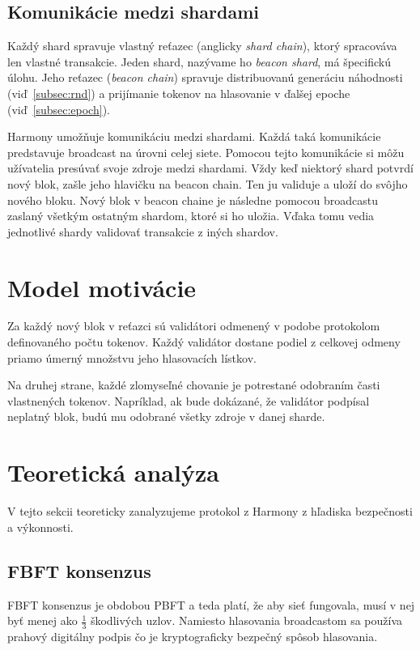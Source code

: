 \subsection{Komunikácie medzi shardami}\label{subsec:cross-com}
Každý shard spravuje vlastný reťazec (anglicky \textit{shard chain}), ktorý spracováva len vlastné transakcie. Jeden shard, nazývame ho \textit{beacon shard}, má špecifickú úlohu. Jeho reťazec (\textit{beacon chain}) spravuje distribuovanú generáciu náhodnosti (viď~\ref{subsec:rnd}) a prijímanie tokenov na hlasovanie v ďalšej epoche (viď~\ref{subsec:epoch}).

Harmony umožňuje komunikáciu medzi shardami. Každá taká komunikácie predstavuje broadcast na úrovni celej siete. Pomocou tejto komunikácie si môžu užívatelia presúvať svoje zdroje medzi shardami. Vždy keď niektorý shard potvrdí nový blok, zašle jeho hlavičku na beacon chain. Ten ju validuje a uloží do svôjho nového bloku. Nový blok v beacon chaine je následne pomocou broadcastu zaslaný všetkým ostatným shardom, ktoré si ho uložia. Vďaka tomu vedia jednotlivé shardy validovať transakcie z iných shardov.

\section{Model motivácie}

Za každý nový blok v reťazci sú validátori odmenený v podobe protokolom definovaného počtu tokenov. Každý validátor dostane podiel z celkovej odmeny priamo úmerný množstvu jeho hlasovacích lístkov.

Na druhej strane, každé zlomyseľné chovanie je potrestané odobraním časti vlastnených tokenov. Napríklad, ak bude dokázané, že validátor podpísal neplatný blok, budú mu odobrané všetky zdroje v danej sharde.

\section{Teoretická analýza}
V tejto sekcii teoreticky zanalyzujeme protokol z Harmony z hľadiska bezpečnosti a výkonnosti.

\subsection{FBFT konsenzus}
FBFT konsenzus je obdobou PBFT a teda platí, že aby sieť fungovala, musí v nej byť menej ako $\frac{1}{3}$ škodlivých uzlov. Namiesto hlasovania broadcastom sa používa prahový digitálny podpis čo je kryptograficky bezpečný spôsob hlasovania.

